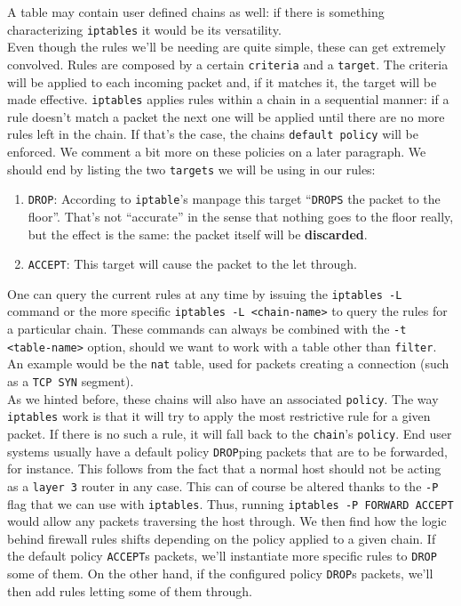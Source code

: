             A table may contain user defined chains as well: if there is something characterizing \texttt{iptables} it would be its versatility.\\

            Even though the rules we'll be needing are quite simple, these can get extremely convolved. Rules are composed by a certain \texttt{criteria} and a \texttt{target}. The criteria will be applied to each incoming packet and, if it matches it, the target will be made effective. \texttt{iptables} applies rules within a chain in a sequential manner: if a rule doesn't match a packet the next one will be applied until there are no more rules left in the chain. If that's the case, the chains \texttt{default policy} will be enforced. We comment a bit more on these policies on a later paragraph. We should end by listing the two \texttt{targets} we will be using in our rules:\\

            \begin{enumerate}
                \item \texttt{DROP}: According to \texttt{iptable}'s manpage this target ``\texttt{DROPS} the packet to the floor''. That's not ``accurate'' in the sense that nothing goes to the floor really, but the effect is the same: the packet itself will be \textbf{discarded}.
                \item \texttt{ACCEPT}: This target will cause the packet to the let through.
            \end{enumerate}

            One can query the current rules at any time by issuing the \texttt{iptables -L} command or the more specific \texttt{iptables -L <chain-name>} to query the rules for a particular chain. These commands can always be combined with the \texttt{-t <table-name>} option, should we want to work with a table other than \texttt{filter}. An example would be the \texttt{nat} table, used for packets creating a connection (such as a \texttt{TCP SYN} segment).\\

            As we hinted before, these chains will also have an associated \texttt{policy}. The way \texttt{iptables} work is that it will try to apply the most restrictive rule for a given packet. If there is no such a rule, it will fall back to the \texttt{chain}'s \texttt{policy}. End user systems usually have a default policy \texttt{DROP}ping packets that are to be forwarded, for instance. This follows from the fact that a normal host should not be acting as a \texttt{layer 3} router in any case. This can of course be altered thanks to the \texttt{-P} flag that we can use with \texttt{iptables}. Thus, running \texttt{iptables -P FORWARD ACCEPT} would allow any packets traversing the host through. We then find how the logic behind firewall rules shifts depending on the policy applied to a given chain. If the default policy \texttt{ACCEPT}s packets, we'll instantiate more specific rules to \texttt{DROP} some of them. On the other hand, if the configured policy \texttt{DROP}s packets, we'll then add rules letting some of them through.\\

